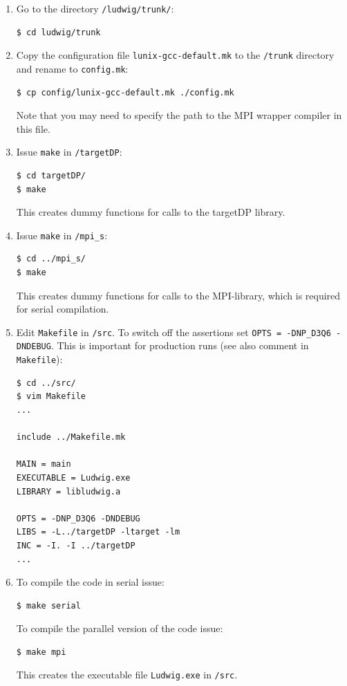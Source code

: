 \documentclass[11pt,twoside,a4paper]{article}
\begin{document}
\begin{enumerate}
\item Go to the directory \texttt{/ludwig/trunk/}: \\
\begin{lstlisting}
$ cd ludwig/trunk
\end{lstlisting}
\item Copy the configuration file \texttt{lunix-gcc-default.mk} to the \texttt{/trunk} directory 
and rename to \texttt{config.mk}: \\
\begin{lstlisting}
$ cp config/lunix-gcc-default.mk ./config.mk
\end{lstlisting}
Note that you may need to specify the path to the MPI wrapper compiler in this file.
\item Issue \texttt{make} in \texttt{/targetDP}: \\
\begin{lstlisting}
$ cd targetDP/
$ make 
\end{lstlisting}
This creates dummy functions for calls to the targetDP library.
\item Issue \texttt{make} in \texttt{/mpi\_s}: \\
\begin{lstlisting}
$ cd ../mpi_s/
$ make 
\end{lstlisting}
This creates dummy functions for calls to the MPI-library,
which is required for serial compilation.
\item Edit \texttt{Makefile} in \texttt{/src}. To switch off 
the assertions set \texttt{OPTS = -DNP\_D3Q6 -DNDEBUG}. This is
important for production runs (see also comment in \texttt{Makefile}): \\
\begin{lstlisting}
$ cd ../src/
$ vim Makefile
...

include ../Makefile.mk

MAIN = main
EXECUTABLE = Ludwig.exe
LIBRARY = libludwig.a

OPTS = -DNP_D3Q6 -DNDEBUG
LIBS = -L../targetDP -ltarget -lm
INC = -I. -I ../targetDP
...
\end{lstlisting}
\item To compile the code in serial issue: \\
\begin{lstlisting}
$ make serial
\end{lstlisting} 
To compile the parallel version of the code issue: \\
\begin{lstlisting}
$ make mpi
\end{lstlisting} 
This creates the executable file \texttt{Ludwig.exe} in \texttt{/src}.
\end{enumerate}
\end{document}
